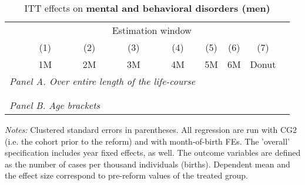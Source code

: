 \vspace*{\fill}
\begin{table}[H] \centering 
	\begin{threeparttable} \centering \caption{ITT effects on \textbf{mental and behavioral disorders (men)}}\label{tab: DD_hopsital2_total}
		{\def\sym#1{\ifmmode^{#1}\else\(^{#1}\)\fi} 
			\begin{tabular}{l*{8}{c}}
				\toprule 
				& \multicolumn{7}{c}{Estimation window} \\ 
				\cmidrule(lr){2-8}
				&\multicolumn{1}{c}{(1)}&\multicolumn{1}{c}{(2)}&\multicolumn{1}{c}{(3)}&\multicolumn{1}{c}{(4)}&\multicolumn{1}{c}{(5)}&\multicolumn{1}{c}{(6)}&\multicolumn{1}{c}{(7)}\\
				&\multicolumn{1}{c}{1M}&\multicolumn{1}{c}{2M}&\multicolumn{1}{c}{3M}&\multicolumn{1}{c}{4M}&\multicolumn{1}{c}{5M}&\multicolumn{1}{c}{6M}&\multicolumn{1}{c}{Donut}\\
				\midrule
				\multicolumn{5}{l}{\emph{Panel A. Over entire length of the life-course}} \\
				 \\ \\
				\multicolumn{5}{l}{\emph{Panel B. Age brackets}} \\
				   
				\bottomrule 
		\end{tabular}}
		\begin{tablenotes} 
			\item \scriptsize \emph{Notes:} Clustered standard errors in parentheses. All regression are run with CG2 (i.e. the cohort prior to the reform) and with month-of-birth FEs. The 'overall' specification includes year fixed effects, as well. The outcome variables are defined as the number of cases per thousand individuals (births). Dependent mean and the effect size correspond to pre-reform values of the treated group.
		\end{tablenotes} 
	\end{threeparttable} 
\end{table}
\vspace*{\fill}\clearpage 